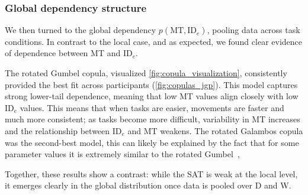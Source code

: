 \documentclass[acmlarge, manuscript,review]{acmart}
\newcommand{\mt}{\ensuremath{{\text{MT}}}\xspace}
\newcommand{\ide}{\ensuremath{{\text{ID}_e}}\xspace}
\newcommand{\D}{\ensuremath{{\text{D}}}\xspace}
\newcommand{\W}{\ensuremath{{\text{W}}}\xspace}
\begin{document}
\subsubsection{Global dependency structure}
We then turned to the global dependency $p(\mt, \ide)$, pooling data across task conditions. In contrast to the local case, and as expected, we found clear evidence of dependence between MT and \ide.

The rotated Gumbel copula, visualized \autoref{fig:copula_visualization}, consistently provided the best fit across participants (\autoref{fig:copulas_jgp}). This model captures strong lower-tail dependence, meaning that low MT values align closely with low \ide values. This means that when tasks are easier, movements are faster and much more consistent; as tasks become more difficult, variability in MT increases and the relationship between \ide and MT weakens. The rotated Galambos copula was the second-best model, this can likely be explained by the fact that for some parameter values it is extremely similar to the rotated Gumbel~\cite{genest2017},

Together, these results show a contrast: while the SAT is weak at the local level, it emerges clearly in the global distribution once data is pooled over D and W.



\end{document}

